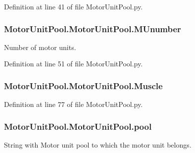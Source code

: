Definition at line 41 of file Motor\+Unit\+Pool.\+py.

\subsubsection[{\texorpdfstring{M\+Unumber}{MUnumber}}]{\setlength{\rightskip}{0pt plus 5cm}Motor\+Unit\+Pool.\+Motor\+Unit\+Pool.\+M\+Unumber}\hypertarget{class_motor_unit_pool_1_1_motor_unit_pool_aa5884530baaa20f46007805bc574407d}{}\label{class_motor_unit_pool_1_1_motor_unit_pool_aa5884530baaa20f46007805bc574407d}


Number of motor units. 



Definition at line 51 of file Motor\+Unit\+Pool.\+py.

\subsubsection[{\texorpdfstring{Muscle}{Muscle}}]{\setlength{\rightskip}{0pt plus 5cm}Motor\+Unit\+Pool.\+Motor\+Unit\+Pool.\+Muscle}\hypertarget{class_motor_unit_pool_1_1_motor_unit_pool_a69b76b7748d3fd22f7367be8dd82d6cf}{}\label{class_motor_unit_pool_1_1_motor_unit_pool_a69b76b7748d3fd22f7367be8dd82d6cf}


Definition at line 77 of file Motor\+Unit\+Pool.\+py.

\subsubsection[{\texorpdfstring{pool}{pool}}]{\setlength{\rightskip}{0pt plus 5cm}Motor\+Unit\+Pool.\+Motor\+Unit\+Pool.\+pool}\hypertarget{class_motor_unit_pool_1_1_motor_unit_pool_a832364dc014aa8a1b2947abfe063f626}{}\label{class_motor_unit_pool_1_1_motor_unit_pool_a832364dc014aa8a1b2947abfe063f626}


String with Motor unit pool to which the motor unit belongs. 



